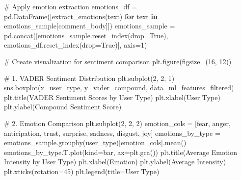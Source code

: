 \documentclass[
  12pt,
  letterpaper,
  DIV=11,
  numbers=noendperiod]{scrartcl}
\newenvironment{Shaded}{\begin{snugshade}}{\end{snugshade}}
\newcommand{\CommentTok}[1]{\textcolor[rgb]{0.37,0.37,0.37}{#1}}
\newcommand{\ControlFlowTok}[1]{\textcolor[rgb]{0.00,0.23,0.31}{\textbf{#1}}}
\newcommand{\DecValTok}[1]{\textcolor[rgb]{0.68,0.00,0.00}{#1}}
\newcommand{\KeywordTok}[1]{\textcolor[rgb]{0.00,0.23,0.31}{\textbf{#1}}}
\newcommand{\NormalTok}[1]{\textcolor[rgb]{0.00,0.23,0.31}{#1}}
\newcommand{\OperatorTok}[1]{\textcolor[rgb]{0.37,0.37,0.37}{#1}}
\newcommand{\StringTok}[1]{\textcolor[rgb]{0.13,0.47,0.30}{#1}}
\newcommand{\VariableTok}[1]{\textcolor[rgb]{0.07,0.07,0.07}{#1}}
\begin{document}
\begin{Shaded}
\begin{Highlighting}[]
\CommentTok{\# Apply emotion extraction}
\NormalTok{emotions\_df }\OperatorTok{=}\NormalTok{ pd.DataFrame([extract\_emotions(text) }\ControlFlowTok{for}\NormalTok{ text }\KeywordTok{in}\NormalTok{ emotions\_sample[}\StringTok{\textquotesingle{}comment\_body\textquotesingle{}}\NormalTok{]])}
\NormalTok{emotions\_sample }\OperatorTok{=}\NormalTok{ pd.concat([emotions\_sample.reset\_index(drop}\OperatorTok{=}\VariableTok{True}\NormalTok{), emotions\_df.reset\_index(drop}\OperatorTok{=}\VariableTok{True}\NormalTok{)], axis}\OperatorTok{=}\DecValTok{1}\NormalTok{)}

\CommentTok{\# Create visualization for sentiment comparison}
\NormalTok{plt.figure(figsize}\OperatorTok{=}\NormalTok{(}\DecValTok{16}\NormalTok{, }\DecValTok{12}\NormalTok{))}

\CommentTok{\# 1. VADER Sentiment Distribution}
\NormalTok{plt.subplot(}\DecValTok{2}\NormalTok{, }\DecValTok{2}\NormalTok{, }\DecValTok{1}\NormalTok{)}
\NormalTok{sns.boxplot(x}\OperatorTok{=}\StringTok{\textquotesingle{}user\_type\textquotesingle{}}\NormalTok{, y}\OperatorTok{=}\StringTok{\textquotesingle{}vader\_compound\textquotesingle{}}\NormalTok{, data}\OperatorTok{=}\NormalTok{ml\_features\_filtered)}
\NormalTok{plt.title(}\StringTok{\textquotesingle{}VADER Sentiment Scores by User Type\textquotesingle{}}\NormalTok{)}
\NormalTok{plt.xlabel(}\StringTok{\textquotesingle{}User Type\textquotesingle{}}\NormalTok{)}
\NormalTok{plt.ylabel(}\StringTok{\textquotesingle{}Compound Sentiment Score\textquotesingle{}}\NormalTok{)}

\CommentTok{\# 2. Emotion Comparison}
\NormalTok{plt.subplot(}\DecValTok{2}\NormalTok{, }\DecValTok{2}\NormalTok{, }\DecValTok{2}\NormalTok{)}
\NormalTok{emotion\_cols }\OperatorTok{=}\NormalTok{ [}\StringTok{\textquotesingle{}fear\textquotesingle{}}\NormalTok{, }\StringTok{\textquotesingle{}anger\textquotesingle{}}\NormalTok{, }\StringTok{\textquotesingle{}anticipation\textquotesingle{}}\NormalTok{, }\StringTok{\textquotesingle{}trust\textquotesingle{}}\NormalTok{, }\StringTok{\textquotesingle{}surprise\textquotesingle{}}\NormalTok{, }\StringTok{\textquotesingle{}sadness\textquotesingle{}}\NormalTok{, }\StringTok{\textquotesingle{}disgust\textquotesingle{}}\NormalTok{, }\StringTok{\textquotesingle{}joy\textquotesingle{}}\NormalTok{]}
\NormalTok{emotions\_by\_type }\OperatorTok{=}\NormalTok{ emotions\_sample.groupby(}\StringTok{\textquotesingle{}user\_type\textquotesingle{}}\NormalTok{)[emotion\_cols].mean()}
\NormalTok{emotions\_by\_type.T.plot(kind}\OperatorTok{=}\StringTok{\textquotesingle{}bar\textquotesingle{}}\NormalTok{, ax}\OperatorTok{=}\NormalTok{plt.gca())}
\NormalTok{plt.title(}\StringTok{\textquotesingle{}Average Emotion Intensity by User Type\textquotesingle{}}\NormalTok{)}
\NormalTok{plt.xlabel(}\StringTok{\textquotesingle{}Emotion\textquotesingle{}}\NormalTok{)}
\NormalTok{plt.ylabel(}\StringTok{\textquotesingle{}Average Intensity\textquotesingle{}}\NormalTok{)}
\NormalTok{plt.xticks(rotation}\OperatorTok{=}\DecValTok{45}\NormalTok{)}
\NormalTok{plt.legend(title}\OperatorTok{=}\StringTok{\textquotesingle{}User Type\textquotesingle{}}\NormalTok{)}


\end{Highlighting}
\end{Shaded}
\end{document}
